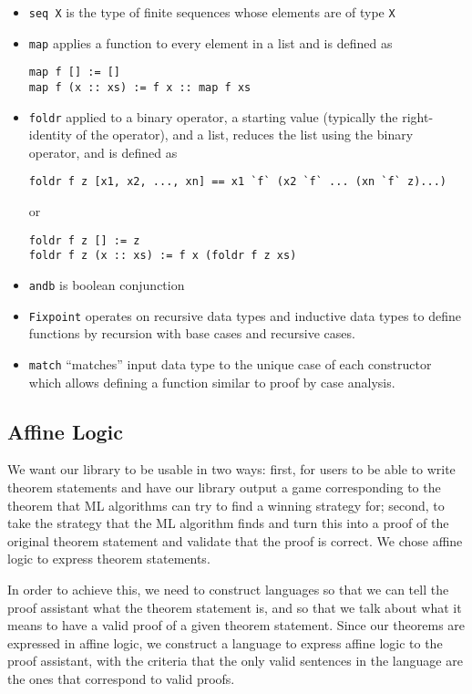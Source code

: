 \documentclass{article}
\theoremstyle{definition}
\begin{document}
\begin{itemize}
    \item \verb|seq X| is the type of finite sequences whose elements are of type \verb|X|
    \item \verb|map| applies a function to every element in a list and is defined as 
\begin{verbatim}
map f [] := []
map f (x :: xs) := f x :: map f xs
\end{verbatim}
 
    \item \verb|foldr| applied to a binary operator, a starting value (typically the right-identity of the operator), and a list, reduces the list using the binary operator, and is defined as 
\begin{verbatim}
foldr f z [x1, x2, ..., xn] == x1 `f` (x2 `f` ... (xn `f` z)...)
\end{verbatim} 
or
\begin{verbatim}
foldr f z [] := z
foldr f z (x :: xs) := f x (foldr f z xs)
\end{verbatim}
    \item \verb|andb| is boolean conjunction
    \item \verb|Fixpoint| operates  on recursive data types and inductive data types to define functions by recursion with base cases and recursive cases.
    \item \verb|match| ``matches'' input data type to the unique case of each constructor which allows defining a function similar to proof by case analysis. 

\end{itemize}

\subsection{Affine Logic}

We want our library to be usable in two ways: first, for users to be able to write theorem statements and have our library output a game corresponding to the theorem that ML algorithms can try to find a winning strategy for; second, to take the strategy that the ML algorithm finds and turn this into a proof of the original theorem statement and validate that the proof is correct. 
We chose affine logic to express theorem statements. 

In order to achieve this, we need to construct languages so that we can tell the proof assistant what the theorem statement is, and so that we talk about what it means to have a valid proof of a given theorem statement. Since our theorems are expressed in affine logic, we construct a language to express affine logic to the proof assistant, with the criteria that the only valid sentences in the language are the ones that correspond to valid proofs. 
\end{document}
